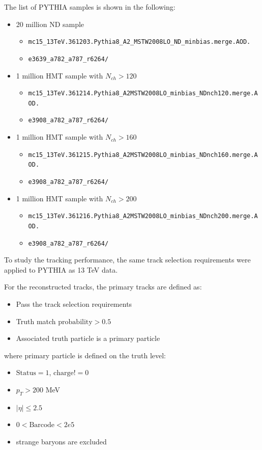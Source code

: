 The list of PYTHIA samples is shown in the following:
\begin{itemize}
\item 20 million ND sample
\begin{itemize}[leftmargin=*]
\item[] \verb|mc15_13TeV.361203.Pythia8_A2_MSTW2008LO_ND_minbias.merge.AOD.|
\item[] \verb|e3639_a782_a787_r6264/|
\end{itemize}
\item 1 million HMT sample with $N_{ch}>120$
\begin{itemize}[leftmargin=*]
\item[] \verb|mc15_13TeV.361214.Pythia8_A2MSTW2008LO_minbias_NDnch120.merge.AOD.|
\item[] \verb|e3908_a782_a787_r6264/|
\end{itemize}
\item 1 million HMT sample with $N_{ch}>160$
\begin{itemize}[leftmargin=*]
\item[] \verb|mc15_13TeV.361215.Pythia8_A2MSTW2008LO_minbias_NDnch160.merge.AOD.|
\item[] \verb|e3908_a782_a787_r6264/|
\end{itemize}
\item 1 million HMT sample with $N_{ch}>200$
\begin{itemize}[leftmargin=*]
\item[] \verb|mc15_13TeV.361216.Pythia8_A2MSTW2008LO_minbias_NDnch200.merge.AOD.|
\item[] \verb|e3908_a782_a787_r6264/|
\end{itemize}
\end{itemize}



To study the tracking performance, the same track selection requirements were applied to PYTHIA as 13 TeV data.

For the reconstructed tracks, the primary tracks are defined as:
\begin{itemize}
\item Pass the track selection requirements
\item Truth match $\text{probability}>0.5$
\item Associated truth particle is a primary particle
\end{itemize}
where primary particle is defined on the truth level:
\begin{itemize}
\item $\text{Status}=1$, $\text{charge}!=0$
\item $p_{T}>200$ MeV
\item $|\eta|\le 2.5$
\item $0<\text{Barcode}<2e5$
\item strange baryons are excluded
\end{itemize}

